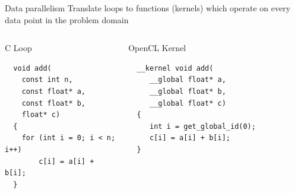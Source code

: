 \documentclass[10pt,aspectratio=169]{beamer} %
\begin{document}
\begin{frame}[fragile,t]{Data parallelism}
\vspace{1em}
Translate loops to functions (kernels) which operate on every data point in the problem domain
\vspace{1em}
\begin{columns}[t]
\begin{column}{0.5\textwidth}
\alert{C Loop}
\begin{lstlisting}
  void add(
    const int n,
    const float* a,
    const float* b,
    float* c)
  {
    for (int i = 0; i < n; i++)
        c[i] = a[i] + b[i];
  }
\end{lstlisting}
\end{column}%
\hspace{-10pt}
\vrule{}%
\hspace{15pt}
\begin{column}{0.5\textwidth}
\alert{OpenCL Kernel}
\begin{lstlisting}
  __kernel void add(                             
     __global float* a,                      
     __global float* b,                      
     __global float* c)               
  {                                          
     int i = get_global_id(0);
     c[i] = a[i] + b[i];
  }   
  
  \end{lstlisting}
\end{column}
\end{columns}
\end{frame}
\end{document}
